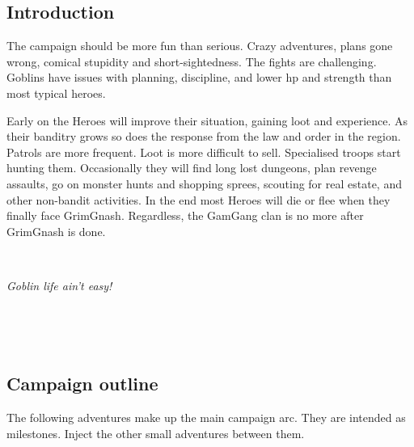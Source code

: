 \subsection*{Introduction}

The campaign should be more fun than serious. Crazy adventures, plans gone wrong, comical stupidity and short-sightedness. The fights are challenging. Goblins have issues with planning, discipline, and lower hp and strength than most typical heroes.

Early on the Heroes will improve their situation, gaining loot and experience. As their banditry grows so does the response from the law and order in the region. Patrols are more frequent. Loot is more difficult to sell. Specialised troops start hunting them. Occasionally they will find long lost dungeons, plan revenge assaults, go on monster hunts and shopping sprees, scouting for real estate, and other non-bandit activities. In the end most Heroes will die or flee when they finally face GrimGnash. Regardless, the GamGang clan is no more after GrimGnash is done.


\

\noindent \textit{Goblin life ain't easy!}

\

\


\subsection*{Campaign outline}

The following adventures make up the main campaign arc. They are intended as milestones. Inject the other small adventures between them.

